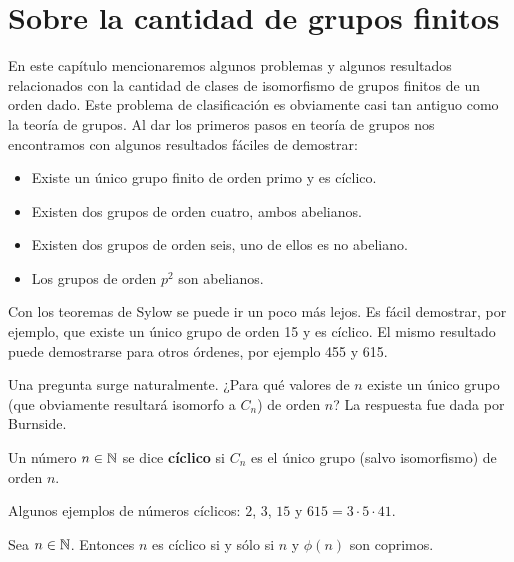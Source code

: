 \chapter{Sobre la cantidad de grupos finitos}
\label{cantidad}

En este capítulo mencionaremos algunos problemas y algunos resultados relacionados con la
cantidad de clases de isomorfismo de grupos finitos de un orden dado. 
Este problema de clasificación 
es obviamente casi tan antiguo como la teoría de grupos. Al dar los primeros pasos en teoría de grupos
nos encontramos con algunos resultados fáciles de demostrar:
\begin{itemize}
    \item Existe un único grupo finito de orden primo y es cíclico. 
    \item Existen dos grupos de orden cuatro, ambos abelianos. 
    \item Existen dos grupos de orden seis, uno de ellos es no abeliano. 
    \item Los grupos de orden $p^2$ son abelianos. 
\end{itemize}

Con los teoremas de Sylow se puede ir un poco más lejos. Es fácil demostrar, por ejemplo,
que existe un único grupo de orden 15 y es cíclico. El mismo resultado puede
demostrarse para otros órdenes, por ejemplo 455 y 615. 

Una pregunta surge naturalmente. ¿Para qué valores de $n$ 
existe un único grupo (que obviamente resultará isomorfo a $C_n$) de orden $n$? 
La respuesta fue dada por Burnside. 

\begin{definition}
Un número $n\in\mathbb{N}$ 
se dice \textbf{cíclico} si $C_n$ es el único grupo (salvo isomorfismo) de
orden $n$.
\end{definition}

Algunos ejemplos de números cíclicos: $2$, $3$, $15$ y 
$615=3\cdot 5\cdot 41$. 

\begin{theorem}[Burnside]
	Sea $n\in\mathbb{N}$. Entonces $n$ es cíclico si y sólo si 
	$n$ y $\phi(n)$ son coprimos.
\end{theorem}

